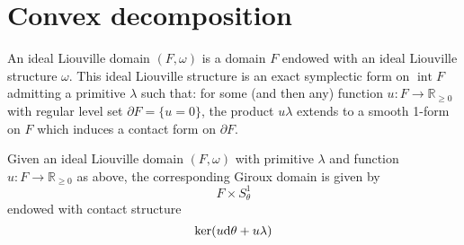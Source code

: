 \section*{Convex decomposition}

\begin{definition} \cite[Definition 1]{Giroux20}
An ideal Liouville domain
$(F, \omega)$ is a domain $F$ endowed with an ideal Liouville structure $\omega$. This
ideal Liouville structure is an exact symplectic form on $\operatorname{int} F$
admitting a primitive $\lambda$ such that: for some (and then any) function 
$u \colon F \to \mathbb R_{\geq 0}$  with regular level set $\partial F = \{u = 0\}$,
the product $u\lambda$ extends to a smooth 1-form on $F$ which 
induces a contact form on $\partial F$.
\end{definition}

\begin{definition}\cite[Section 5.3]{MNW13}
    \label{def:giroux_domain}
    Given an ideal Liouville domain $(F, \omega)$ with primitive $\lambda$
    and function $u \colon F \to \mathbb R_{\geq 0}$ as above,
    the corresponding Giroux domain is given by
    \[
        F \times S^1_\theta
    \]
    endowed with contact structure
    \[
        \ker(u \mathrm{d} \theta + u \lambda)
    \]
\end{definition}

